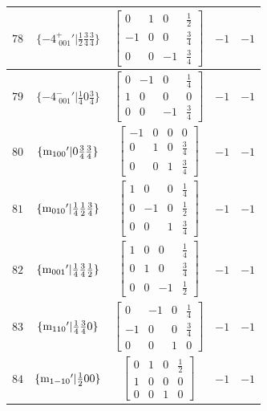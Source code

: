 \documentclass[fleqn,8pt]{jsarticle}
\begin{document}
\begin{longtable}{ccccc}
$ 78 $ & $ \{-4^{+}_{\,\,001}{}'|\frac{1}{2} \frac{3}{4} \frac{3}{4}\} $ & $ \begin{bmatrix} 0 & 1 & 0 & \frac{1}{2} \\ -1 & 0 & 0 & \frac{3}{4} \\ 0 & 0 & -1 & \frac{3}{4} \end{bmatrix} $ & $ -1 $ & $ -1 $ \\ \hline
$ 79 $ & $ \{-4^{-}_{\,\,001}{}'|\frac{1}{4} 0 \frac{3}{4}\} $ & $ \begin{bmatrix} 0 & -1 & 0 & \frac{1}{4} \\ 1 & 0 & 0 & 0 \\ 0 & 0 & -1 & \frac{3}{4} \end{bmatrix} $ & $ -1 $ & $ -1 $ \\ \hline
$ 80 $ & $ \{{\rm m}_{100}{}'|0 \frac{3}{4} \frac{3}{4}\} $ & $ \begin{bmatrix} -1 & 0 & 0 & 0 \\ 0 & 1 & 0 & \frac{3}{4} \\ 0 & 0 & 1 & \frac{3}{4} \end{bmatrix} $ & $ -1 $ & $ -1 $ \\ \hline
$ 81 $ & $ \{{\rm m}_{010}{}'|\frac{1}{4} \frac{1}{2} \frac{3}{4}\} $ & $ \begin{bmatrix} 1 & 0 & 0 & \frac{1}{4} \\ 0 & -1 & 0 & \frac{1}{2} \\ 0 & 0 & 1 & \frac{3}{4} \end{bmatrix} $ & $ -1 $ & $ -1 $ \\ \hline
$ 82 $ & $ \{{\rm m}_{001}{}'|\frac{1}{4} \frac{3}{4} \frac{1}{2}\} $ & $ \begin{bmatrix} 1 & 0 & 0 & \frac{1}{4} \\ 0 & 1 & 0 & \frac{3}{4} \\ 0 & 0 & -1 & \frac{1}{2} \end{bmatrix} $ & $ -1 $ & $ -1 $ \\ \hline
$ 83 $ & $ \{{\rm m}_{110}{}'|\frac{1}{4} \frac{3}{4} 0\} $ & $ \begin{bmatrix} 0 & -1 & 0 & \frac{1}{4} \\ -1 & 0 & 0 & \frac{3}{4} \\ 0 & 0 & 1 & 0 \end{bmatrix} $ & $ -1 $ & $ -1 $ \\ \hline
$ 84 $ & $ \{{\rm m}_{1-10}{}'|\frac{1}{2} 0 0\} $ & $ \begin{bmatrix} 0 & 1 & 0 & \frac{1}{2} \\ 1 & 0 & 0 & 0 \\ 0 & 0 & 1 & 0 \end{bmatrix} $ & $ -1 $ & $ -1 $ \\ \hline

\end{longtable}
\end{document}

